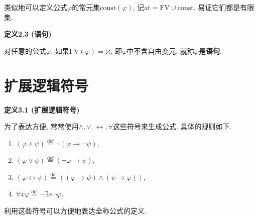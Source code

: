 \vspace{10pt}

类似地可以定义公式$\varphi$的常元集$\mathrm{const}(\varphi)$,
记$\mathrm{at}=\mathrm{FV}\cup\mathrm{const}$. 易证它们都是有限集.

\vspace{10pt}

\hypertarget{sec:定义2.3}{}
\noindent\textbf{定义2.3 (语句)}

对任意的公式$\varphi$, 如果$\mathrm{FV}(\varphi)=\varnothing$,
即$\varphi$中不含自由变元, 就称$\varphi$是\textbf{语句}.

\vspace{20pt}





\section{扩展逻辑符号}

\hypertarget{sec:定义3.1}{}
\noindent\textbf{定义3.1 (扩展逻辑符号)}

为了表达方便, 常常使用$\land,\lor,\leftrightarrow,\forall$这些符号来生成公式.
具体的规则如下.
\begin{enumerate}
    \item $(\varphi\land\psi)\overset{\mathrm{def}}{=}\neg(\varphi\to\neg\psi)$,
    \item $(\varphi\lor\psi)\overset{\mathrm{def}}{=}(\neg\varphi\to\psi)$,
    \item $(\varphi\leftrightarrow\psi)\overset{\mathrm{def}}{=}
    ((\varphi\to\psi)\land(\psi\to\varphi))$,
    \item $\forall x\varphi\overset{\mathrm{def}}{=}\neg\exists x\neg\varphi$.
\end{enumerate}

\vspace{10pt}

利用这些符号可以方便地表达全称公式的定义.

